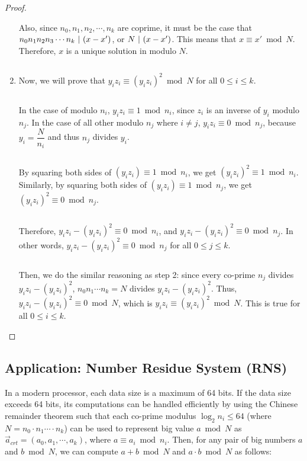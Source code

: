\begin{proof}
\begin{enumerate}
Also, since $n_0, n_1, n_2, \cdots, n_k$ are coprime, it must be the case that $n_0n_1n_2n_3\cdots n_k \text{ } \text{$|$} \text{ } (x - x')$, or $N \text{ } \text{$|$} \text{ } (x - x')$. This means that $x \equiv x' \bmod N$. Therefore, $x$ is a unique solution in modulo $N$.

$ $

\item Now, we will prove that $y_iz_i \equiv (y_iz_i)^2 \bmod N$  \text{ } for all $0 \leq i \leq k$. 

$ $

In the case of modulo $n_i$, $y_iz_i \equiv 1 \bmod n_i$, since $z_i$ is an inverse of $y_i$ modulo $n_j$. In the case of all other modulo $n_j$ where $i \neq j$, $y_iz_i \equiv 0 \bmod n_j$, because $y_i = \dfrac{N}{n_i}$ and thus $n_j$ divides $y_i$. 

$ $

By squaring both sides of $(y_iz_i) \equiv 1 \bmod n_i$, we get $(y_iz_i)^2 \equiv 1 \bmod n_i$. Similarly, by squaring both sides of $(y_iz_i) \equiv 1 \bmod n_j$, we get $(y_iz_i)^2 \equiv 0 \bmod n_j$.

$ $

Therefore, $y_iz_i - (y_iz_i)^2 \equiv 0 \bmod n_i$, and $y_iz_i - (y_iz_i)^2 \equiv 0 \bmod n_j$. In other words, $y_iz_i - (y_iz_i)^2 \equiv 0 \bmod n_j$ for all $0 \leq j \leq k$. 

$ $

Then, we do the similar reasoning as step 2: since every co-prime $n_j$ divides $y_iz_i - (y_iz_i)^2$, $n_0n_1\cdots n_k = N$ divides $y_iz_i - (y_iz_i)^2$. Thus, $y_iz_i - (y_iz_i)^2 \equiv 0 \bmod N$, which is $y_iz_i \equiv (y_iz_i)^2 \bmod N$. This is true for all $0 \leq i \leq k$. 

\end{enumerate}

\end{proof}


\subsection{Application: Number Residue System (RNS)} 
\label{subsec:crt-application}

In a modern processor, each data size is a maximum of 64 bits. If the data size exceeds 64 bits, its computations can be handled efficiently by using the Chinese remainder theorem such that each co-prime modulus $\log_2n_i \leq 64$ (where $N = n_0\cdot n_1\cdots\cdot n_k$) can be used to represent big value $a \bmod N$ as $\vec{a}_{\mathit{crt}} = (a_0, a_1, \cdots , a_k)$, where $a \equiv a_i \bmod n_i$. Then, for any pair of big numbers $a$ and $b \bmod N$, we can compute $a + b \bmod N$ and $a \cdot b \bmod N$ as follows: 

